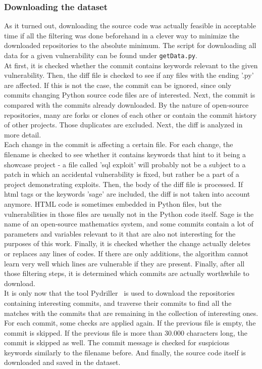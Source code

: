 \documentclass[
a4paper,
pagesize,
pdftex,
12pt,
twoside, %
BCOR=5mm, %
ngerman,
fleqn,
final,
]{scrartcl}
\begin{document}
	\subsubsection{Downloading the dataset}
	As it turned out, downloading the source code was actually feasible in acceptable time if all the filtering was done beforehand in a clever way to minimize the downloaded repositories to the absolute minimum. The script for downloading all data for a given vulnerability can be found under \texttt{getData.py}.\\
	At first, it is checked whether the commit contains keywords relevant to the given vulnerability. Then, the diff file is checked to see if any files with the ending '.py' are affected. If this is not the case, the commit can be ignored, since only commits changing Python source code files are of interested. Next, the commit is compared with the commits already downloaded. By the nature of open-source repositories, many are forks or clones of each other or contain the commit history of other projects. Those duplicates are excluded. Next, the diff is analyzed in more detail.\\
	Each change in the commit is affecting a certain file. For each change, the filename is checked to see whether it contains keywords that hint to it being a showcase project - a file called 'sql exploit' will probably not be a subject to a patch in which an accidental vulnerability is fixed, but rather be a part of a project demonstrating exploits. Then, the body of the diff file is processed. If html tags or the keywords 'sage' are included, the diff is not taken into account anymore. HTML code is sometimes embedded in Python files, but the vulnerabilities in those files are usually not in the Python code itself. Sage is the name of an open-source mathematics system, and some commits contain a lot of parameters and variables relevant to it that are also not interesting for the purposes of this work. Finally, it is checked whether the change actually deletes or replaces any lines of codes. If there are only additions, the algorithm cannot learn very well which lines are vulnerable if they are present. Finally, after all those filtering steps, it is determined which commits are actually worthwhile to download.\\
	It is only now that the tool Pydriller~\cite{Spadini.2018} is used to download the repositories containing interesting commits, and traverse their commits to find all the matches with the commits that are remaining in the collection of interesting ones. For each commit, some checks are applied again. If the previous file is empty, the commit is skipped. If the previous file is more than 30.000 characters long, the commit is skipped as well. The commit message is checked for suspicious keywords similarly to the filename before. And finally, the source code itself is downloaded and saved in the dataset. 
	
\end{document}
